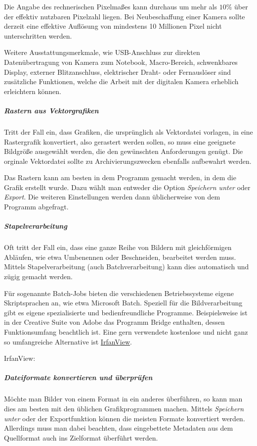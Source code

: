 Die Angabe des rechnerischen Pixelmaßes kann durchaus um mehr als $10\%$ über der effektiv nutzbaren Pixelzahl liegen. Bei Neubeschaffung einer Kamera sollte derzeit eine effektive Auflösung von mindestens 10 Millionen Pixel nicht unterschritten werden.

Weitere Ausstattungsmerkmale, wie USB-Anschluss zur direkten Datenübertragung von Kamera zum Notebook, Macro-Bereich, schwenkbares Display, externer Blitzanschluss, elektrischer Draht- oder Fernauslöser sind zusätzliche Funktionen, welche die Arbeit mit der digitalen Kamera erheblich erleichtern können.

\subparagraph{Rastern aus Vektorgrafiken} Tritt der Fall ein, dass Grafiken, die ursprünglich als Vektordatei vorlagen, in eine Rastergrafik konvertiert, also gerastert werden sollen, so muss eine geeignete Bildgröße ausgewählt werden, die den gewünschten Anforderungen genügt. Die orginale Vektordatei sollte zu Archivierungszwecken ebenfalls aufbewahrt werden. 

Das Rastern kann am besten in dem Programm gemacht werden, in dem die Grafik erstellt wurde. Dazu wählt man entweder die Option \emph{Speichern unter} oder \emph{Export}. Die weiteren Einstellungen werden dann üblicherweise von dem Programm abgefragt.

\subparagraph{Stapelverarbeitung} Oft tritt der Fall ein, dass eine ganze Reihe von Bildern mit gleichförmigen Abläufen, wie etwa Umbenennen oder Beschneiden, bearbeitet werden muss. Mittels Stapelverarbeitung (auch Batchverarbeitung) kann dies automatisch und zügig gemacht werden. 

Für sogenannte Batch-Jobs bieten die verschiedenen Betriebssysteme eigene Skriptsprachen an, wie etwa Microsoft Batch. Speziell für die Bildverarbeitung gibt es eigene spezialisierte und bedienfreundliche Programme. Beispielsweise ist in der Creative Suite von Adobe das Programm Bridge enthalten, dessen Funktionsumfang beachtlich ist. Eine gern verwendete kostenlose und nicht ganz so umfangreiche Alternative ist \href{http://www.irfanview.de/}{IrfanView}.

\begin{flushleft}
	IrfanView: 
\end{flushleft}

\subparagraph{Dateiformate konvertieren und überprüfen} Möchte man Bilder von einem Format in ein anderes überführen, so kann man dies am besten mit den üblichen Grafikprogrammen machen. Mittels \emph{Speichern unter} oder der Exportfunktion können die meisten Formate konvertiert werden. Allerdings muss man dabei beachten, dass eingebettete Metadaten aus dem Quellformat auch ins Zielformat überführt werden. 

